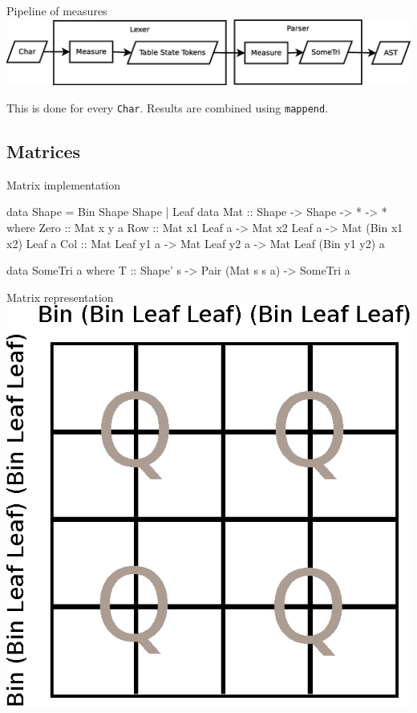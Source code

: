 \documentclass{beamer}
\begin{document}
\begin{frame}{Pipeline of measures}
\includegraphics[width=\textwidth]{pipeline.eps}

This is done for every \texttt{Char}. Results are combined using
\texttt{mappend}.
\end{frame}

\subsection{Matrices}
\begin{frame}[fragile]{Matrix implementation}
\begin{code}
data Shape = Bin Shape Shape | Leaf
data Mat :: Shape -> Shape -> * -> * where
  Zero :: Mat x y a
  Row :: Mat x1 Leaf a -> Mat x2 Leaf a -> Mat (Bin x1 x2) Leaf a
  Col :: Mat Leaf y1 a -> Mat Leaf y2 a -> Mat Leaf (Bin y1 y2) a

data SomeTri a where
  T :: Shape' s -> Pair (Mat s s a) -> SomeTri a
\end{code}
\end{frame}

\begin{frame}{Matrix representation}
    \centering
    \includegraphics[width=.5\textwidth]{example-matrix-4x4.eps}
\end{frame}
\end{document}

